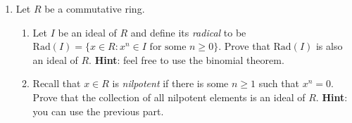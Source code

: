 \documentclass[11pt]{article}
\begin{document}
\begin{enumerate}
\item Let $R$ be a commutative ring.
\begin{enumerate}
\item Let $I$ be an ideal of $R$ and define its \emph{radical} to be $\mathrm{Rad}(I) = \{x \in R\colon x^n \in I \textrm{ for some $n \geq 0$}\}$. Prove that $\mathrm{Rad}(I)$ is also an ideal of $R$. {\bf Hint}: feel free to use the binomial theorem.
\item Recall that $x\in R$ is \emph{nilpotent} if there is some $n \geq 1$ such that $x^n=0$. Prove that the collection of all nilpotent elements is an ideal of $R$. {\bf Hint}: you can use the previous part.
\end{enumerate}



\end{enumerate}
\end{document}
